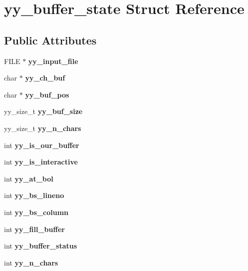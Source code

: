 \section{yy\_\-buffer\_\-state Struct Reference}
\label{structyy__buffer__state}
\subsection*{Public Attributes}
\begin{DoxyCompactItemize}
\item 
FILE $\ast$ {\bfseries yy\_\-input\_\-file}\label{structyy__buffer__state_a4360acfb226a1fc240ab2be17dd6beda}

\item 
char $\ast$ {\bfseries yy\_\-ch\_\-buf}\label{structyy__buffer__state_a0d25458e69eb22207fc633a1255d099d}

\item 
char $\ast$ {\bfseries yy\_\-buf\_\-pos}\label{structyy__buffer__state_a8435c3f786bbb55d21d0174e4cfc22a0}

\item 
yy\_\-size\_\-t {\bfseries yy\_\-buf\_\-size}\label{structyy__buffer__state_a48302f5f3477a9c78bbddf56d356ef54}

\item 
yy\_\-size\_\-t {\bfseries yy\_\-n\_\-chars}\label{structyy__buffer__state_a06406208824817acfec2183b79080945}

\item 
int {\bfseries yy\_\-is\_\-our\_\-buffer}\label{structyy__buffer__state_a80ce2431c70dc4f89ced487f18449465}

\item 
int {\bfseries yy\_\-is\_\-interactive}\label{structyy__buffer__state_abf5c70eea75581b58c0ee7bd31b14490}

\item 
int {\bfseries yy\_\-at\_\-bol}\label{structyy__buffer__state_a9d60c60af6e1a6f69de16871fd64f85f}

\item 
int {\bf yy\_\-bs\_\-lineno}
\item 
int {\bf yy\_\-bs\_\-column}
\item 
int {\bfseries yy\_\-fill\_\-buffer}\label{structyy__buffer__state_a63d2afbb1d79a3fc63df9e12626f827d}

\item 
int {\bfseries yy\_\-buffer\_\-status}\label{structyy__buffer__state_a70fd925d37a2f0454fbd0def675d106c}

\item 
int {\bfseries yy\_\-n\_\-chars}\label{structyy__buffer__state_a06406208824817acfec2183b79080945}

\end{DoxyCompactItemize}


